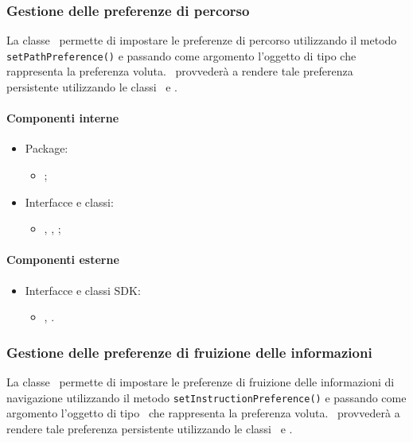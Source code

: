 \documentclass[../Funzionalita.tex]{subfiles}
\begin{document}
		
		\subsubsection{Gestione delle preferenze di percorso}
			La classe \SettingImp\ permette di impostare le preferenze di percorso utilizzando il metodo \lstinline|setPathPreference()| e passando come argomento l'oggetto di tipo \PathPreference che rappresenta la preferenza voluta. \SettingImp\ provvederà a rendere tale preferenza persistente utilizzando le classi \SharedPreference\ e \SharedPreferenceEditor.

			\paragraph*{Componenti interne}
			\begin{itemize}
			
				\item Package:
				\begin{itemize}
					\item[] \usersetting;
				\end{itemize}
				
				\item Interfacce e classi:
				\begin{itemize}
					\item[] \Setting, \SettingImp, \PathPreference;
				\end{itemize}
				
			\end{itemize}
			
			
			\paragraph*{Componenti esterne}
			
			\begin{itemize}
				\item Interfacce e classi SDK:
				\begin{itemize}
					\item[] \SharedPreference, \SharedPreferenceEditor.
				\end{itemize}
			\end{itemize}
		
		
		\subsubsection{Gestione delle preferenze di fruizione delle informazioni}
			La classe \SettingImp\ permette di impostare le preferenze di fruizione delle informazioni di navigazione utilizzando il metodo \lstinline|setInstructionPreference()| e passando come argomento l'oggetto di tipo \InstructionPreference\ che rappresenta la preferenza voluta. \SettingImp\ provvederà a rendere tale preferenza persistente utilizzando le classi \SharedPreference\ e \SharedPreferenceEditor.
		
\end{document}
